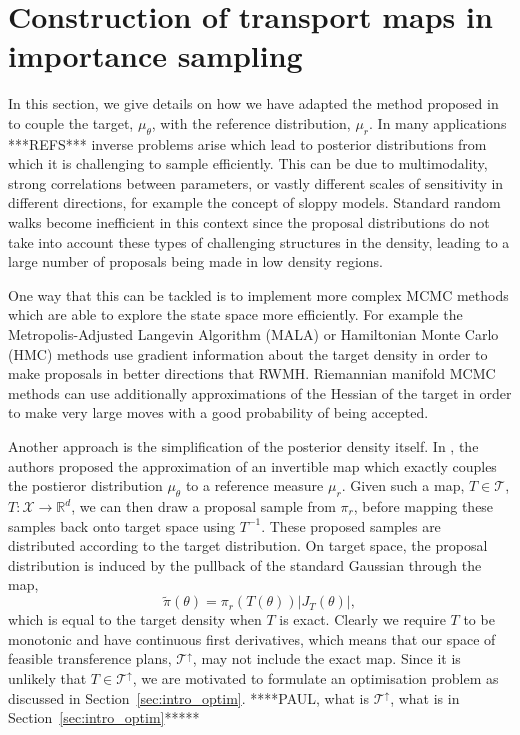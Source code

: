 \documentclass[final]{siamltex}
\begin{document}
\section{Construction of transport maps in importance sampling} \label{sec:map}

In this section, we give details on how we have adapted the method
proposed in \cite{parno2014transport} to couple the target,
$\mu_{\theta}$, with the reference distribution, $\mu_r$. In many
applications ***REFS*** inverse problems arise which lead to posterior
distributions from which it is challenging to sample efficiently. This
can be due to multimodality, strong correlations between parameters,
or vastly different scales of sensitivity in different directions, for
example the concept of sloppy models. Standard random walks become
inefficient in this context since the proposal distributions do not
take into account these types of challenging structures in the
density, leading to a large number of proposals being made in low
density regions.

One way that this can be tackled is to implement more complex MCMC
methods which are able to explore the state space more
efficiently. For example the Metropolis-Adjusted Langevin Algorithm (MALA) or Hamiltonian Monte
Carlo (HMC) methods use gradient information about the target density
in order to make proposals in better directions that RWMH. Riemannian
manifold MCMC methods can use additionally approximations of the
Hessian of the target in order to make very large moves with a good
probability of being accepted.

Another approach is the simplification of the posterior density
itself. In \cite{parno2014transport}, the authors proposed the
approximation of an invertible map which exactly couples the postieror distribution
$\mu_{\theta}$ to a reference measure $\mu_r$. Given such a map,
$T\in\mathcal{T}$, $T\colon \mathcal{X}\rightarrow\mathbb{R}^d$, we can then draw a proposal sample from $\pi_r$, before mapping these samples back onto target space using $T^{-1}$. These proposed samples are distributed according to the target distribution. On target space, the proposal distribution is induced by the pullback of the standard Gaussian through the map,
\begin{equation}\label{eq:pullback}
	\tilde{\pi}(\theta) = \pi_r(T(\theta))|J_T(\theta)|,
\end{equation}
which is equal to the target density when $T$ is exact. Clearly we
require $T$ to be monotonic and have continuous first derivatives,
which means that our space of feasible transference plans,
$\mathcal{T}^\uparrow$, may not include the exact map. Since it is
unlikely that $T\in\mathcal{T}^\uparrow$, we are motivated to
formulate an optimisation problem as discussed in
Section~\ref{sec:intro_optim}.  ****PAUL, what is
$\mathcal{T}^\uparrow$, what is in Section~\ref{sec:intro_optim}*****
\end{document}

